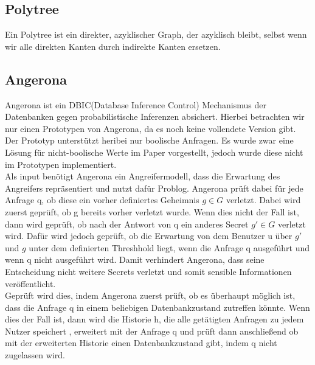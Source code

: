 \documentclass[german,version-2020-11]{uzl-thesis}
\begin{document}
\subsection{Polytree}
Ein Polytree ist ein direkter, azyklischer Graph, der azyklisch bleibt, selbst wenn wir alle direkten Kanten durch indirekte Kanten ersetzen.
\subsection{Angerona}
Angerona ist ein DBIC(Database Inference Control) Mechanismus der Datenbanken gegen probabilistische Inferenzen absichert. Hierbei betrachten wir nur einen Prototypen von Angerona, da es noch keine vollendete Version gibt. Der Prototyp unterstützt heribei nur boolische Anfragen. Es wurde zwar eine Lösung für nicht-boolische Werte im Paper vorgestellt, jedoch wurde diese nicht im Prototypen implementiert.\\ 
 Als input benötigt Angerona ein Angreifermodell, dass die Erwartung des Angreifers repräsentiert und nutzt dafür Problog.  Angerona prüft dabei für jede Anfrage q, ob diese ein vorher definiertes Geheimnis $g \in G$ verletzt. Dabei wird zuerst geprüft, ob g bereits vorher verletzt wurde. Wenn dies nicht der Fall ist, dann wird geprüft, ob nach der Antwort von q ein anderes Secret $g' \in G$  verletzt wird. Dafür wird jedoch geprüft, ob die Erwartung von dem Benutzer u über $g'$ und $g$  unter dem definierten Threshhold liegt, wenn die Anfrage q ausgeführt und wenn q nicht ausgeführt wird. Damit verhindert Angerona, dass seine Entscheidung nicht weitere Secrets verletzt und somit sensible Informationen veröffentlicht.  \\ Geprüft wird dies, indem Angerona zuerst prüft, ob es überhaupt möglich ist, dass die Anfrage q in einem beliebigen Datenbankzustand zutreffen könnte. Wenn dies der Fall ist, dann wird die Historie h, die alle getätigten Anfragen zu jedem Nutzer speichert , erweitert mit der Anfrage q und prüft dann anschließend ob mit der erweiterten Historie einen Datenbankzustand gibt, indem q nicht zugelassen wird. \cite{6}
\end{document}
